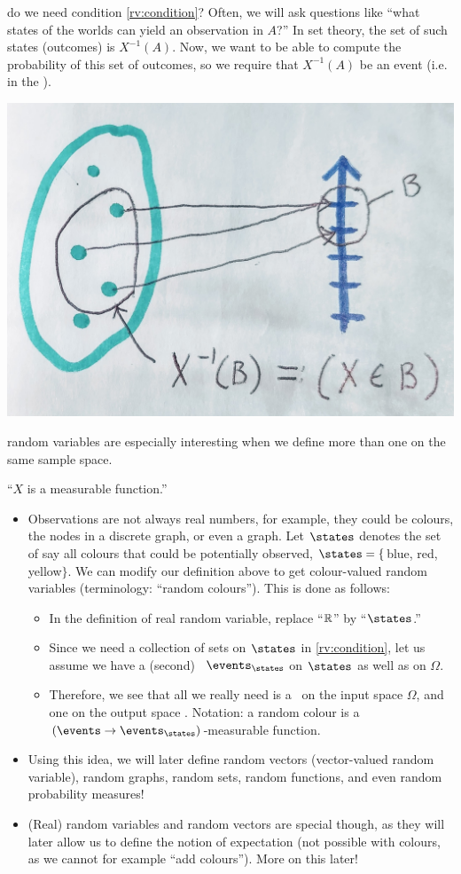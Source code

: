 \documentclass{article}
\begin{document}
 do we need condition \ref{rv:condition}? Often, we will ask questions like ``what states of the worlds can yield an observation in $A$?'' In set theory, the set of such states (outcomes) is $X^{-1}(A)$. Now, we want to be able to compute the probability of this set of outcomes, so we require that $X^{-1}(A)$ be an event (i.e. in the \sigmaalg).
\begin{center}
	\includegraphics[width=0.5\linewidth]{figures/inverse}
\end{center}

 random variables are especially interesting when we define more than one on the same sample space. 

 ``$X$ is a measurable function.'' 

\begin{itemize}
  \item Observations are not always real numbers, for example, they could be colours, the nodes in a discrete graph, or even a graph. Let $\states$ denotes the set of say all colours that could be potentially observed, $\states = \{$blue, red, yellow$\}$. We can modify our definition above to get colour-valued random variables (terminology: ``random colours''). This is done as follows:
  \begin{itemize}
    \item In the definition of real random variable, replace ``${\mathbb R}$'' by ``$\states$.''
    \item Since we need a collection of sets on $\states$ in \ref{rv:condition}, let us assume we have a (second) \sigmaalg\ $\events_\states$ on $\states$ as well as on $\Omega$.
    \item Therefore, we see that all we really need is a \sigmaalg\ on the input space $\Omega$, and one on the output space \sigmaalg. Notation: a random colour is a $(\events \to \events_\states)$-measurable function.
  \end{itemize}
  \item Using this idea, we will later define random vectors (vector-valued random variable), random graphs, random sets, random functions, and even random probability measures!
  \item (Real) random variables and random vectors are special though, as they will later allow us to define the notion of expectation (not possible with colours, as we cannot for example ``add colours''). More on this later!
\end{itemize}
\end{document}
